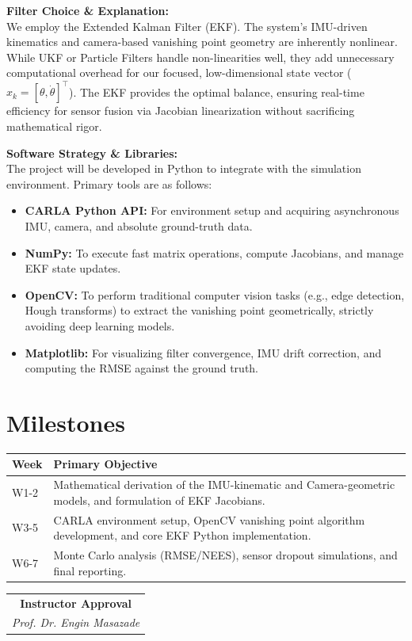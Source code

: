 \documentclass[12pt]{article}
\begin{document}
\textbf{Filter Choice \& Explanation:}\\
We employ the Extended Kalman Filter (EKF). The system's IMU-driven kinematics and camera-based vanishing point geometry are inherently nonlinear. While UKF or Particle Filters handle non-linearities well, they add unnecessary computational overhead for our focused, low-dimensional state vector ($x_k = [\theta, \dot{\theta}]^\top$). The EKF provides the optimal balance, ensuring real-time efficiency for sensor fusion via Jacobian linearization without sacrificing mathematical rigor.

\vspace{0.3cm}
\textbf{Software Strategy \& Libraries:}\\
The project will be developed in Python to integrate with the simulation environment. Primary tools are as follows:
\begin{itemize}
    \item \textbf{CARLA Python API:} For environment setup and acquiring asynchronous IMU, camera, and absolute ground-truth data.
    \item \textbf{NumPy:} To execute fast matrix operations, compute Jacobians, and manage EKF state updates.
    \item \textbf{OpenCV:} To perform traditional computer vision tasks (e.g., edge detection, Hough transforms) to extract the vanishing point geometrically, strictly avoiding deep learning models.
    \item \textbf{Matplotlib:} For visualizing filter convergence, IMU drift correction, and computing the RMSE against the ground truth.
\end{itemize}

\section{Milestones}

\begin{table}[h!]
\centering
\renewcommand{\arraystretch}{1.2}
\begin{tabular}{lp{12cm}}
\hline
\textbf{Week} & \textbf{Primary Objective} \\
\hline
W1-2 & Mathematical derivation of the IMU-kinematic and Camera-geometric models, and formulation of EKF Jacobians. \\
W3-5 & CARLA environment setup, OpenCV vanishing point algorithm development, and core EKF Python implementation. \\
W6-7 & Monte Carlo analysis (RMSE/NEES), sensor dropout simulations, and final reporting. \\
\hline
\end{tabular}
\end{table}
\vspace{1em}
\begin{flushright}
    \begin{tabular}{c}
        \hline
        \textbf{Instructor Approval} \\
        \textit{Prof. Dr. Engin Masazade}
    \end{tabular}
\end{flushright}

\newpage



\end{document}
